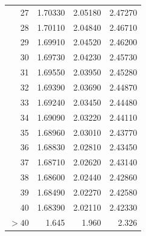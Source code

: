 \documentclass{article}
\begin{document}
\begin{minipage}[t]{6cm}
\begin{center}
\begin{tabular}{|r|rrr|}
				27 & 1.70330 & 2.05180 & 2.47270 \\
				28 & 1.70110 & 2.04840 & 2.46710 \\
				29 & 1.69910 & 2.04520 & 2.46200 \\
				30 & 1.69730 & 2.04230 & 2.45730 \\
				31 & 1.69550 & 2.03950 & 2.45280 \\
				32 & 1.69390 & 2.03690 & 2.44870 \\
				33 & 1.69240 & 2.03450 & 2.44480 \\
				34 & 1.69090 & 2.03220 & 2.44110 \\
				35 & 1.68960 & 2.03010 & 2.43770 \\
				36 & 1.68830 & 2.02810 & 2.43450 \\
				37 & 1.68710 & 2.02620 & 2.43140 \\
				38 & 1.68600 & 2.02440 & 2.42860 \\
				39 & 1.68490 & 2.02270 & 2.42580 \\
				40 & 1.68390 & 2.02110 & 2.42330 \\
				$>40$& 1.645 & 1.960 & 2.326 \\ \hline
			\end{tabular}
		\end{center}
	\end{minipage}\hspace{2cm} 
\end{document}
